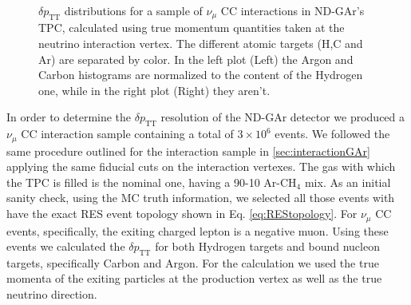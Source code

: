 \begin{figure}[!ht]
\begin{subfigure}[b]{0.48\textwidth}
         \caption{}
    \label{fig:MCunscaled_Targets}
     \end{subfigure}
        \caption[$\delta p_\text{TT}$ distributions for a sample of $\nu_\mu$ CC interactions in ND-GAr's TPC, calculated using true quantities.]{$\delta p_\text{TT}$ distributions for a sample of $\nu_\mu$ CC interactions in ND-GAr's TPC, calculated using true momentum quantities taken at the neutrino interaction vertex. The different atomic targets (H,C and Ar) are separated by color. In the left plot (Left) the Argon and Carbon histograms are normalized to the content of the Hydrogen one, while in the right plot (Right) they aren't. } \label{fig:MC_Targets}
\end{figure}

In order to determine the $\delta p_\text{TT}$ resolution of the ND-GAr detector we produced a $\nu_\mu$ CC interaction sample containing a total of $3\times10^6$ events. We followed the same procedure outlined for the interaction sample in \ref{sec:interactionGAr} applying the same fiducial cuts on the interaction vertexes. The gas with which the TPC is filled is the nominal one, having a 90-10 Ar-CH$_4$ mix. As an initial sanity check, using the MC truth information, we selected all those events with have the exact RES event topology shown in Eq. \ref{eq:REStopology}. For $\nu_\mu$ CC events, specifically, the exiting charged lepton is a negative muon. Using these events we calculated the $\delta p_\text{TT}$ for both Hydrogen targets and bound nucleon targets, specifically Carbon and Argon. For the calculation we used the true momenta of the exiting particles at the production vertex as well as the true neutrino direction. 
